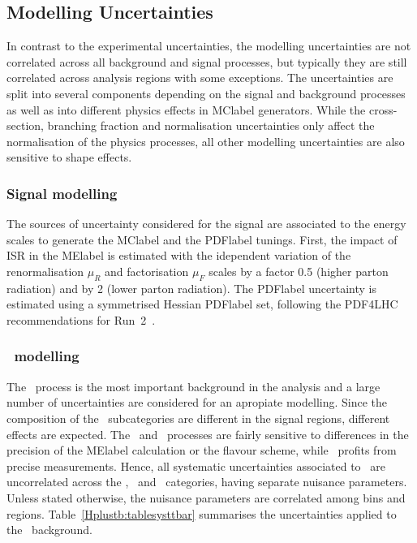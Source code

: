 \subsection{Modelling Uncertainties}
In contrast to the experimental uncertainties, the modelling uncertainties are not correlated across all background and signal processes, but typically they are still correlated across analysis regions with some exceptions. The uncertainties are split into several components depending on the signal and background processes as well as into different physics effects in \acrshort{MClabel} generators. While the cross-section, branching fraction and normalisation uncertainties only affect the normalisation of the physics processes, all other modelling uncertainties are also sensitive to shape effects.


\subsubsection{Signal modelling}

The sources of uncertainty considered for the signal are associated to the energy scales to generate the \acrshort{MClabel} and the \acrshort{PDFlabel} tunings. First, the impact of ISR in the \acrshort{MElabel} is estimated with the idependent variation of the renormalisation $\mu_R$ and factorisation $\mu_F$ scales by a factor 0.5 (higher parton radiation) and by 2 (lower parton radiation). The \acrshort{PDFlabel} uncertainty is estimated using a symmetrised Hessian \acrshort{PDFlabel} set, following the PDF4LHC recommendations for Run~2~\cite{Butterworth_2016}.
\subsubsection{\ttbar\ modelling}

The \ttbar\ process is the most important background in the analysis and a large number of uncertainties are considered for an apropiate modelling. Since the composition of the \ttbar\ subcategories are different in the signal regions, different effects are expected. The \ttb\ and \ttc\ processes are fairly sensitive to differences in the precision of the \acrshort{MElabel} calculation or the flavour scheme, while \ttl\ profits from precise measurements. Hence, all systematic uncertainties associated to \ttbar\ are uncorrelated across the \ttb, \ttc\ and \ttl\ categories, having separate nuisance parameters. Unless stated otherwise, the nuisance parameters are correlated among bins and regions. Table~\ref{Hplustb:tablesysttbar} summarises the uncertainties applied to the \ttbar\ background.  

